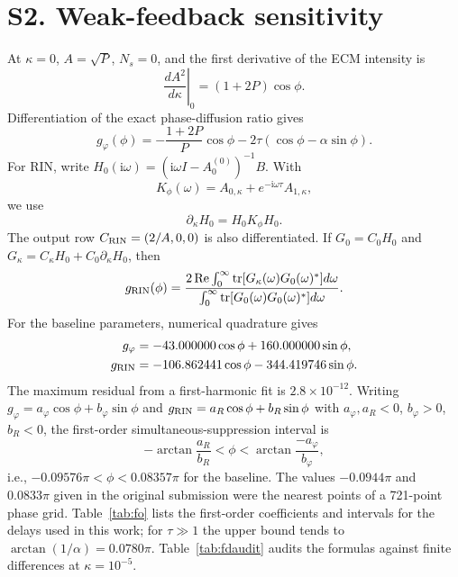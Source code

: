 \documentclass[11pt]{article}
\newcommand{\ii}{\mathrm{i}}
\newcommand{\Tr}{\operatorname{tr}}
\newif\ifmarked
\newcommand{\rev}[1]{\ifmarked{\color{blue}#1}\else#1\fi}
\begin{document}
\section*{S2. Weak-feedback sensitivity}

At $\kappa=0$, $A=\sqrt P$, $N_s=0$, and the first derivative of the ECM intensity is
\begin{equation}
\left.\frac{dA^2}{d\kappa}\right|_{0}=(1+2P)\cos\phi.
\end{equation}
Differentiation of the exact phase-diffusion ratio gives
\begin{equation}
g_\varphi(\phi)=-\frac{1+2P}{P}\cos\phi-2\tau(\cos\phi-\alpha\sin\phi).
\end{equation}
For RIN, write $H_0(\ii\omega)=(\ii\omega I-A_0^{(0)})^{-1}B$. With
\begin{equation}
K_\phi(\omega)=A_{0,\kappa}+e^{-\ii\omega\tau}A_{1,\kappa},
\end{equation}
we use
\begin{equation}
\partial_\kappa H_0=H_0K_\phi H_0.
\end{equation}
The output row $C_{\rm RIN}=(2/A,0,0)$ is also differentiated. If $G_0=C_0H_0$ and
$G_\kappa=C_\kappa H_0+C_0\partial_\kappa H_0$, then
\begin{equation}
g_{\rm RIN}(\phi)=
\frac{2\,\mathrm{Re}\int_0^\infty \Tr[G_\kappa(\omega)G_0(\omega)^*]d\omega}
{\int_0^\infty \Tr[G_0(\omega)G_0(\omega)^*]d\omega}.
\end{equation}
For the baseline parameters, numerical quadrature gives
\begin{align}
g_\varphi&=-43.000000\cos\phi+160.000000\sin\phi,\\
g_{\rm RIN}&=-106.862441\cos\phi-344.419746\sin\phi.
\end{align}
The maximum residual from a first-harmonic fit is $2.8\times10^{-12}$. \rev{Writing $g_\varphi=a_\varphi\cos\phi+b_\varphi\sin\phi$ and $g_{\rm RIN}=a_R\cos\phi+b_R\sin\phi$ with $a_\varphi,a_R<0$, $b_\varphi>0$, $b_R<0$, the first-order simultaneous-suppression interval is
\begin{equation}
-\arctan\frac{a_R}{b_R}<\phi<\arctan\frac{-a_\varphi}{b_\varphi},
\end{equation}
i.e., $-0.09576\pi<\phi<0.08357\pi$ for the baseline. The values $-0.0944\pi$ and $0.0833\pi$ given in the original submission were the nearest points of a 721-point phase grid. Table~\ref{tab:fo} lists the first-order coefficients and intervals for the delays used in this work; for $\tau\gg1$ the upper bound tends to $\arctan(1/\alpha)=0.0780\pi$.} Table~\ref{tab:fdaudit} audits the formulas against finite differences at $\kappa=10^{-5}$.
\end{document}
